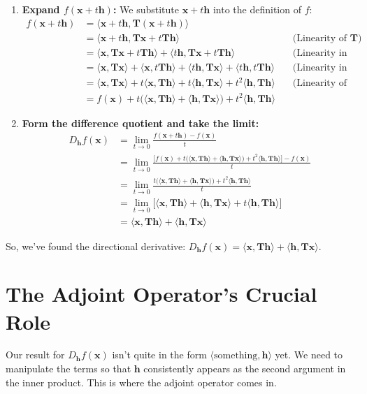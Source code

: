 \documentclass[11pt]{article}
\theoremstyle{mydefinitionstyle}
\theoremstyle{mytheoremstyle}
\theoremstyle{remark}
\newcommand{\T}{\mathbf{T}} %
\newcommand{\x}{\mathbf{x}} %
\newcommand{\h}{\mathbf{h}} %
\newcommand{\inner}[2]{\langle #1, #2 \rangle} %
\begin{document}
\begin{enumerate}
    \item \textbf{Expand $f(\x + t\h)$:}
        We substitute $\x + t\h$ into the definition of $f$:
        \begin{align*}
            f(\x + t\h) &= \inner{\x + t\h}{\T(\x + t\h)} \\
            &= \inner{\x + t\h}{\T\x + t\T\h} \quad &\text{(Linearity of } \T\text{)} \\
            &= \inner{\x}{\T\x + t\T\h} + \inner{t\h}{\T\x + t\T\h} \quad &\text{(Linearity in 1st arg)} \\
            &= \inner{\x}{\T\x} + \inner{\x}{t\T\h} + \inner{t\h}{\T\x} + \inner{t\h}{t\T\h} \quad &\text{(Linearity in 2nd arg)} \\
            &= \inner{\x}{\T\x} + t\inner{\x}{\T\h} + t\inner{\h}{\T\x} + t^2\inner{\h}{\T\h} \quad &\text{(Linearity of inner product)} \\
            &= f(\x) + t\big( \inner{\x}{\T\h} + \inner{\h}{\T\x} \big) + t^2\inner{\h}{\T\h}
        \end{align*}

    \item \textbf{Form the difference quotient and take the limit:}
        \begin{align*}
            D_{\h}f(\x) &= \lim_{t \to 0} \frac{f(\x + t\h) - f(\x)}{t} \\
            &= \lim_{t \to 0} \frac{\big[ f(\x) + t\big( \inner{\x}{\T\h} + \inner{\h}{\T\x} \big) + t^2\inner{\h}{\T\h} \big] - f(\x)}{t} \\
            &= \lim_{t \to 0} \frac{t\big( \inner{\x}{\T\h} + \inner{\h}{\T\x} \big) + t^2\inner{\h}{\T\h}}{t} \\
            &= \lim_{t \to 0} \big[ \inner{\x}{\T\h} + \inner{\h}{\T\x} + t\inner{\h}{\T\h} \big] \\
            &= \inner{\x}{\T\h} + \inner{\h}{\T\x}
        \end{align*}
\end{enumerate}
So, we've found the directional derivative: $D_{\h}f(\x) = \inner{\x}{\T\h} + \inner{\h}{\T\x}$.

\section{The Adjoint Operator's Crucial Role}

Our result for $D_{\h}f(\x)$ isn't quite in the form $\inner{\text{something}}{\h}$ yet. We need to manipulate the terms so that $\h$ consistently appears as the second argument in the inner product. This is where the adjoint operator comes in.
\end{document}
